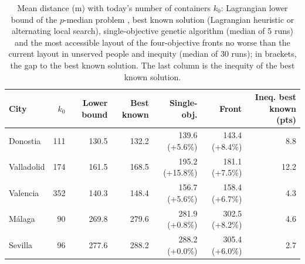 \begin{table}[htbp]
\centering
\small
\caption{Mean distance (m) with today's number of containers $k_0$: Lagrangian lower bound of the $p$-median problem \cite{beasley1993lagrangean}, best known solution (Lagrangian heuristic or alternating local search), single-objective genetic algorithm (median of 5 runs) and the most accessible layout of the four-objective fronts no worse than the current layout in unserved people and inequity (median of 30 runs); in brackets, the gap to the best known solution. The last column is the inequity of the best known solution.}
\label{tab:bounds}
\begin{tabular}{lrrrrrr}
\toprule
\textbf{City} & $k_0$ & \textbf{Lower bound} & \textbf{Best known} & \textbf{Single-obj.} & \textbf{Front} & \textbf{Ineq. best known (pts)} \\
\midrule
Donostia & 111 & 130.5 & 132.2 & 139.6 (+5.6\%) & 143.4 (+8.4\%) & 8.8 \\
Valladolid & 174 & 161.5 & 168.5 & 195.2 (+15.8\%) & 181.1 (+7.5\%) & 12.2 \\
Valencia & 352 & 140.3 & 148.4 & 156.7 (+5.6\%) & 158.4 (+6.7\%) & 4.3 \\
Málaga & 90 & 269.8 & 279.6 & 281.9 (+0.8\%) & 302.5 (+8.2\%) & 4.6 \\
Sevilla & 96 & 277.6 & 288.2 & 288.2 (+0.0\%) & 305.4 (+6.0\%) & 2.7 \\
\bottomrule
\end{tabular}
\end{table}
